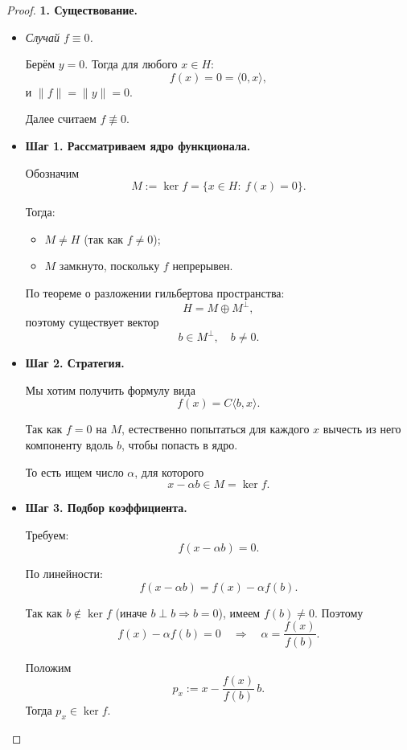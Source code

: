 \begin{proof}
	\textbf{1. Существование.}
	
	\begin{itemize}
		
		\item \textit{Случай $f \equiv 0$.}
		
		Берём $y=0$. Тогда для любого $x\in H$:
		$$
		f(x)=0=\langle 0,x\rangle,
		$$
		и $\|f\|=\|y\|=0$.
		
		Далее считаем $f\not\equiv 0$.
		
		\medskip
		
		\item \textbf{Шаг 1. Рассматриваем ядро функционала.}
		
		Обозначим
		$$
		M:=\ker f=\{x\in H:\ f(x)=0\}.
		$$
		
		Тогда:
		\begin{itemize}
			\item $M\neq H$ (так как $f\neq 0$);
			\item $M$ замкнуто, поскольку $f$ непрерывен.
		\end{itemize}
		
		По теореме о разложении гильбертова пространства:
		$$
		H = M \oplus M^\perp,
		$$
		поэтому существует вектор
		$$
		b\in M^\perp,\quad b\neq 0.
		$$
		
		\medskip
		
		\item \textbf{Шаг 2. Стратегия.}
		
		Мы хотим получить формулу вида
		$$
		f(x)=C\langle b,x\rangle.
		$$
		
		Так как $f=0$ на $M$, естественно попытаться для каждого $x$
		вычесть из него компоненту вдоль $b$, чтобы попасть в ядро.
		
		То есть ищем число $\alpha$, для которого
		$$
		x-\alpha b\in M=\ker f.
		$$
		
		\medskip
		
		\item \textbf{Шаг 3. Подбор коэффициента.}
		
		Требуем:
		$$
		f(x-\alpha b)=0.
		$$
		
		По линейности:
		$$
		f(x-\alpha b)=f(x)-\alpha f(b).
		$$
		
		Так как $b\notin \ker f$ (иначе $b\perp b\Rightarrow b=0$),
		имеем $f(b)\neq 0$. Поэтому
		$$
		f(x)-\alpha f(b)=0
		\quad\Rightarrow\quad
		\alpha=\frac{f(x)}{f(b)}.
		$$
		
		Положим
		$$
		p_x:=x-\frac{f(x)}{f(b)}\,b.
		$$
		Тогда $p_x\in\ker f$.
		

\end{itemize}
\end{proof}
